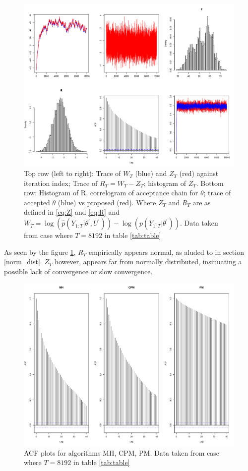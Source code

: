 \documentclass{article}
\begin{document}
\begin{figure}[H]
  \centerline{\includegraphics[scale=1]{experi1_plots}}
  \caption{Top row (left to right): Trace of $W_T$ (blue) and $Z_T$ (red) against iteration index; Trace of $R_T=W_T-Z_T$; histogram of $Z_T$.  Bottom row: Histogram of R, correlogram of acceptance chain for $\theta$; trace of accepted $\theta$ (blue) vs proposed (red). Where $Z_T$ and $R_T$ are as defined in \eqref{eq:Z} and \eqref{eq:R} and $W_T = \log(\hat{p}(Y_{1:T}| \theta^\prime, U^\prime)) - \log(p(Y_{1:T}|\theta^\prime))$. Data taken from case where $T=8192$ in table \ref{tab:table}}
  \label{fig:theFig}
\end{figure}

As seen by the figure \ref{fig:theFig}, $R_T$ empirically appears normal, as aluded to in section \ref{norm_dist}. $Z_T$ however, appears far from normally distributed, insinuating a possible lack of convergence or slow convergence.

\begin{figure}[H]
  \centerline{\includegraphics[scale=1]{acf_plots}}
  \caption{ACF plots for algorithms MH, CPM, PM. Data taken from case where $T=8192$ in table \ref{tab:table}}
  \label{fig:acf}
\end{figure}
\end{document}
